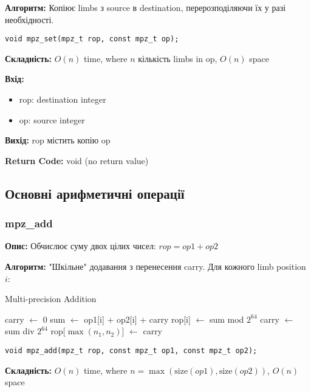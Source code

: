 \textbf{Алгоритм:} Копіює limbs з source в destination, перерозподіляючи їх у разі необхідності.

\begin{verbatim}
void mpz_set(mpz_t rop, const mpz_t op);
\end{verbatim}

\textbf{Складність:} $O(n)$ time, where $n$ кількість limbs in op, $O(n)$ space

\textbf{Вхід:}
\begin{itemize}
    \item rop: destination integer
    \item op: source integer
\end{itemize}

\textbf{Вихід:} rop містить копію op

\textbf{Return Code:} void (no return value)

\subsection{Основні арифметичні операції}

\subsubsection{mpz\_add}
\textbf{Опис:} Обчислює суму двох цілих чисел: $rop = op1 + op2$

\textbf{Алгоритм:} "Шкільне"{} додавання з перенесення carry. Для кожного limb position $i$:
\newpage

\begin{algorithm}
    \caption{Multi-precision Addition}
    \begin{algorithmic}[1]
        \State carry $\gets$ 0
        \State sum $\gets$ op1[i] + op2[i] + carry
        \State rop[i] $\gets$ sum mod $2^{64}$
        \State carry $\gets$ sum div $2^{64}$
        \EndFor
        \State rop[$\max(n_{1}, n_{2})$] $\gets$ carry
        \EndIf
    \end{algorithmic}
\end{algorithm}

\begin{verbatim}
void mpz_add(mpz_t rop, const mpz_t op1, const mpz_t op2);
\end{verbatim}

\textbf{Складність:} $O(n)$ time, where $n = \max(\text{size}(op1), \text{size}(op2))$, $O(n)$ space

